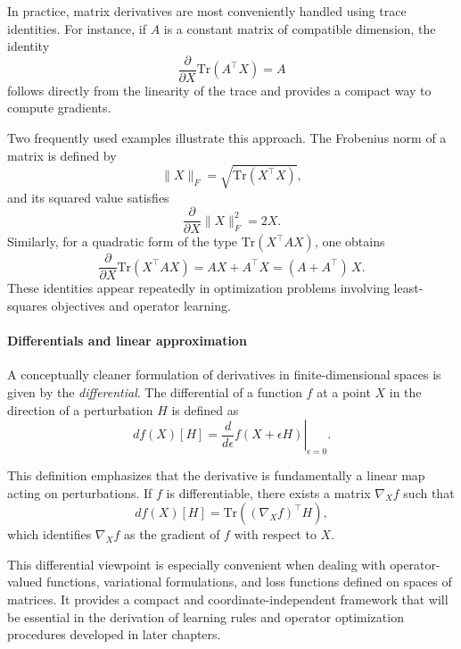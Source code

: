 In practice, matrix derivatives are most conveniently handled using trace identities. For instance, if $A$ is a constant matrix of compatible dimension, the identity
\begin{equation}
    \frac{\partial}{\partial X} \mathrm{Tr}(A^\top X) = A
\end{equation}
follows directly from the linearity of the trace and provides a compact way to compute gradients.

Two frequently used examples illustrate this approach. The Frobenius norm of a matrix is defined by
\begin{equation}
    \|X\|_F = \sqrt{\mathrm{Tr}(X^\top X)},
\end{equation}
and its squared value satisfies
\begin{equation}
    \frac{\partial}{\partial X} \|X\|_F^2 = 2X.
\end{equation}
Similarly, for a quadratic form of the type $\mathrm{Tr}(X^\top A X)$, one obtains
\begin{equation}
    \frac{\partial}{\partial X} \mathrm{Tr}(X^\top A X) 
    = 
    A X + A^\top X
    =
    (A + A^\top)\,X.
\end{equation}
These identities appear repeatedly in optimization problems involving least-squares objectives and operator learning.

\paragraph{Differentials and linear approximation}
A conceptually cleaner formulation of derivatives in finite-dimensional spaces is given by the \emph{differential}. The differential of a function $f$ at a point $X$ in the direction of a perturbation $H$ is defined as
\begin{equation}
    df(X)[H] 
    = 
    \left. \frac{d}{d\epsilon} f(X + \epsilon H) \right|_{\epsilon=0}.
\end{equation}

This definition emphasizes that the derivative is fundamentally a linear map acting on perturbations. If $f$ is differentiable, there exists a matrix $\nabla_X f$ such that
\begin{equation}
    df(X)[H] 
    = 
    \mathrm{Tr}\!\left( (\nabla_X f)^\top H \right),
\end{equation}
which identifies $\nabla_X f$ as the gradient of $f$ with respect to $X$.

This differential viewpoint is especially convenient when dealing with operator-valued functions, variational formulations, and loss functions defined on spaces of matrices. It provides a compact and coordinate-independent framework that will be essential in the derivation of learning rules and operator optimization procedures developed in later chapters.

